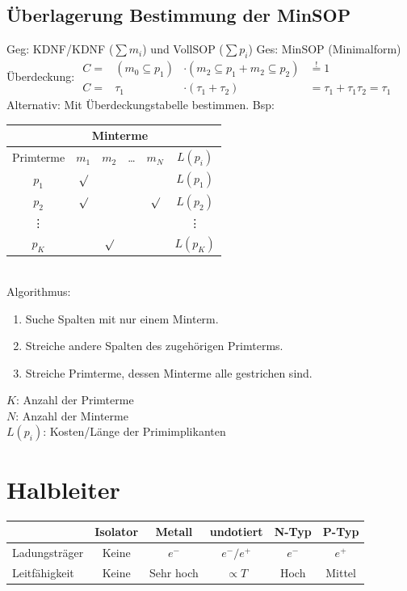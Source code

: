 \documentclass[6pt,a4paper]{scrartcl}
\begin{document}
\begin{multicols*}{3}
	\subsection{Überlagerung Bestimmung der MinSOP}
	Geg: KDNF/KDNF ($\sum m_i$) und VollSOP ($\sum p_i$) \qquad Ges: MinSOP (Minimalform)\\
	Überdeckung: $\begin{array}{rccl} C = & (m_0 \subseteq p_1) & \cdot (m_2 \subseteq p_1 + m_2 \subseteq p_2) & \stackrel{!}=1 \\ C = & \tau_1 & \cdot (\tau_1 + \tau_2) & = \tau_1 + \tau_1 \tau_2 = \tau_1 \end{array}$ \\
	Alternativ: Mit Überdeckungstabelle bestimmen. Bsp:\\
	\begin{tabular}{|c|c|c|c|c|c|}
		\hline
		          &      \multicolumn{4}{c|}{Minterme}  &      \\ \hline
		Primterme &  $m_1$  &  $m_2$  & \dots &  $m_N$  & $L(p_i)$   \\ \bottomrule[1pt]
		  $p_1$   & $\surd$ &         &       &         & $L(p_1)$   \\ \hline
		  $p_2$   & $\surd$ &         &       & $\surd$ & $L(p_2)$   \\ \hline
		 \vdots   &         &         &       &         &  \vdots    \\ \hline
		  $p_K$   &         & $\surd$ &       &         & $L(p_K)$   \\ \hline
	\end{tabular} \\
	Algorithmus:
	\begin{enumerate}
		\item Suche Spalten mit nur einem Minterm.
		\item Streiche andere Spalten des zugehörigen Primterms.
		\item Streiche Primterme, dessen Minterme alle gestrichen sind.
	\end{enumerate}
	$K$: Anzahl der Primterme\\
	$N$: Anzahl der Minterme \\
	$L(p_i)$: Kosten/Länge der Primimplikanten

\section{Halbleiter}
\begin{tabular}{l|c|c|c|c|c}
	& Isolator & Metall & undotiert & N-Typ & P-Typ \\ \hline
	Ladungsträger & Keine & $e^-$ & $e^- / e^+$ & $e^-$ & $e^+$ \\
	Leitfähigkeit & Keine & Sehr hoch & $\propto T$ & Hoch & Mittel\\
\end{tabular}


\end{multicols*}
\end{document}
